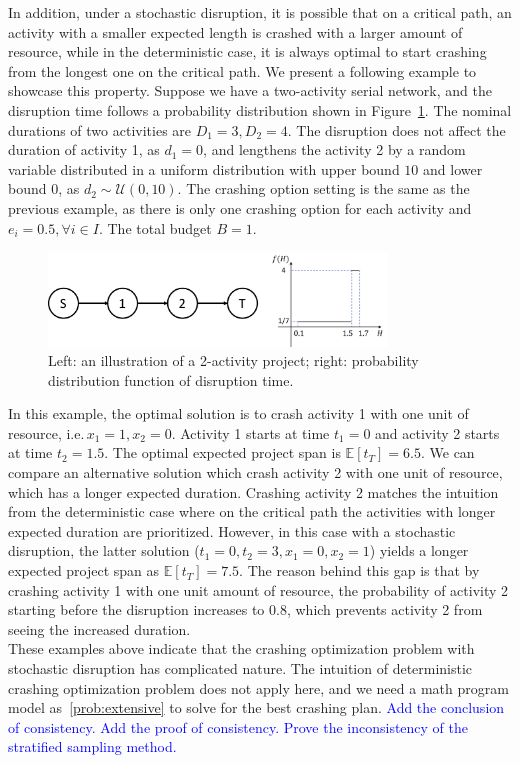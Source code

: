 \documentclass[11pt]{article}
\newcommand{\noi}{\noindent}
\begin{document}
	In addition, under a stochastic disruption, it is possible that on a critical path, an activity with a smaller expected length is crashed with a larger amount of resource, while in the deterministic case, it is always optimal to start crashing from the longest one on the critical path. We present a following example to showcase this property. Suppose we have a two-activity serial network, and the disruption time follows a probability distribution shown in Figure~\ref{fig:2act}. The nominal durations of two activities are \(D_1 = 3, D_2 = 4\). The disruption does not affect the duration of activity 1, as \(d_1 = 0\), and lengthens the activity 2 by a random variable distributed in a uniform distribution with upper bound \(10\) and lower bound \(0\), as \(d_2 \sim \mathcal{U}(0,10)\). The crashing option setting is the same as the previous example, as there is only one crashing option for each activity and \(e_i = 0.5, \forall i \in I\). The total budget \(B = 1\).
		\begin{figure}[H]
			\centering
			\includegraphics[width=0.8\textwidth]{2act}
			\caption{Left: an illustration of a 2-activity project; right: probability distribution function of disruption time.}
			\label{fig:2act}
		\end{figure}
	\noi In this example, the optimal solution is to crash activity 1 with one unit of resource, i.e.\,\(x_1 = 1, x_2 = 0\). Activity 1 starts at time \(t_1 = 0\) and activity 2 starts at time \(t_2 = 1.5\). The optimal expected project span is \(\mathbb{E}[t_T] = 6.5\). We can compare an alternative solution which crash activity 2 with one unit of resource, which has a longer expected duration. Crashing activity 2 matches the intuition from the deterministic case where on the critical path the activities with longer expected duration are prioritized. However, in this case with a stochastic disruption, the latter solution (\(t_1 = 0, t_2 = 3, x_1 = 0, x_2 = 1\)) yields a longer expected project span as \(\mathbb{E}[t_T] = 7.5\). The reason behind this gap is that by crashing activity 1 with one unit amount of resource, the probability of activity 2 starting before the disruption increases to \(0.8\), which prevents activity 2 from seeing the increased duration. \\
	\newline
	These examples above indicate that the crashing optimization problem with stochastic disruption has complicated nature. The intuition of deterministic crashing optimization problem does not apply here, and we need a math program model as~\eqref{prob:extensive} to solve for the best crashing plan.
	\textcolor{blue}{Add the conclusion of consistency. Add the proof of consistency. Prove the inconsistency of the stratified sampling method. }
	
\end{document}
